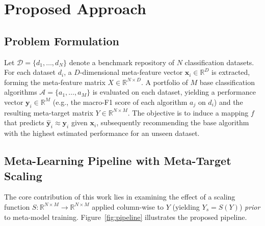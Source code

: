 \documentclass[12pt]{article}
\begin{document}
\section{Proposed Approach}

\subsection{Problem Formulation}

Let $\mathcal{D} = \{d_1, \dots, d_N\}$ denote a benchmark repository of $N$ classification datasets. For each dataset $d_i$, a $D$-dimensional meta-feature vector $\mathbf{x}_i \in \mathbb{R}^D$ is extracted, forming the meta-feature matrix $X \in \mathbb{R}^{N \times D}$. A portfolio of $M$ base classification algorithms $\mathcal{A} = \{a_1, \dots, a_M\}$ is evaluated on each dataset, yielding a performance vector $\mathbf{y}_i \in \mathbb{R}^M$ (e.g., the macro-F1 score of each algorithm $a_j$ on $d_i$) and the resulting meta-target matrix $Y \in \mathbb{R}^{N \times M}$. The objective is to induce a mapping $f$ that predicts $\hat{\mathbf{y}}_i \approx \mathbf{y}_i$ given $\mathbf{x}_i$, subsequently recommending the base algorithm with the highest estimated performance for an unseen dataset.

\subsection{Meta-Learning Pipeline with Meta-Target Scaling}

The core contribution of this work lies in examining the effect of a scaling function $S: \mathbb{R}^{N \times M} \rightarrow \mathbb{R}^{N \times M}$ applied column-wise to $Y$ (yielding $Y_s = S(Y)$) \textit{prior} to meta-model training. Figure~\ref{fig:pipeline} illustrates the proposed pipeline.
\end{document}
